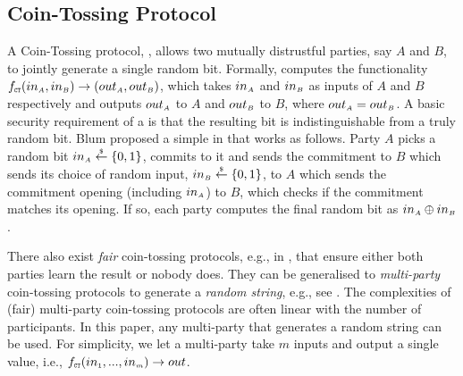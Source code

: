 \subsection{Coin-Tossing Protocol}
\svs
A Coin-Tossing protocol, \ct, allows two mutually distrustful parties, say $A$ and $B$, to jointly generate a single random bit. Formally, \ct computes the functionality $f_{\scriptscriptstyle \mathtt{CT}}(in_{\scriptscriptstyle A}, in_{\scriptscriptstyle B})\rightarrow (out_{\scriptscriptstyle A}, out_{\scriptscriptstyle B})$, which takes $in_{\scriptscriptstyle A}$ and  $in_{\scriptscriptstyle B}$ as inputs of $A$ and $B$ respectively and outputs $out_{\scriptscriptstyle A}$ to $A$ and $out_{\scriptscriptstyle B}$ to $B$, where $out_{\scriptscriptstyle A}=out_{\scriptscriptstyle B}$. A basic security requirement of a \ct is that the resulting bit is indistinguishable from a truly random bit. Blum proposed a simple \ct in \cite{Blum82} that works as follows. Party $A$ picks a random bit $in_{\scriptscriptstyle A}\stackrel{\scriptscriptstyle \$}\leftarrow\{0,1\}$, commits to it and sends the commitment to $B$ which sends its choice of random input, $in_{\scriptscriptstyle B}\stackrel{\scriptscriptstyle \$}\leftarrow\{0,1\}$, to $A$ which sends the commitment opening (including $in_{\scriptscriptstyle A}$) to $B$, which checks if the commitment matches its opening. If so, each party computes the final random bit as $in_{\scriptscriptstyle A}\oplus in_{\scriptscriptstyle B}$.  

There also exist \emph{fair} coin-tossing protocols, e.g., in \cite{MoranNS09}, that ensure either both parties learn the result or nobody does. They can be generalised to \emph{multi-party} coin-tossing protocols to generate a \emph{random string}, e.g., see \cite{BeimelOO10,KiayiasRDO17}.
%
The  complexities of (fair) multi-party coin-tossing protocols are often linear with the number of participants. In this paper, any multi-party \ct that generates a random string can be used. For simplicity, we let a multi-party \fct take $m$ inputs and output a single value, i.e., $f_{\scriptscriptstyle \mathtt{CT}}(in_{\scriptscriptstyle 1}, ..., in_{\scriptscriptstyle m})\rightarrow out$. 








